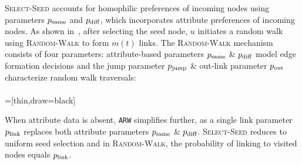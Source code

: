 \textsc{Select-Seed} accounts for homophilic preferences of incoming nodes using
parameters $p_{\scriptsize\mbox{same}}$ and $p_{\scriptsize\mbox{diff}}$, which incorporates attribute preferences of incoming nodes.
As shown in~, after selecting
the seed node, $u$ initiates a
random walk using \textsc{Random-Walk} to form $m(t)$ links.
The \textsc{Random-Walk} mechanism consists of four parameters: attribute-based parameters
$p_{\scriptsize\mbox{same}}$ \& $p_{\scriptsize\mbox{diff}}$ model edge formation decisions and the jump parameter $p_{\scriptsize\mbox{jump}}$ \&
out-link parameter $p_{\scriptsize\mbox{out}}$ characterize random walk traversals:
\\\\
=[thin,draw=black]

When attribute data is absent, \texttt{ARW} simplifies further, as
a single link parameter $p_{\scriptsize\mbox{link}}$ replaces both attribute parameters $p_{\scriptsize\mbox{same}}$ \& $p_{\scriptsize\mbox{diff}}$.
\textsc{Select-Seed} reduces to uniform seed selection and in
\textsc{Random-Walk}, the probability of linking to visited nodes equals $p_{\scriptsize\mbox{link}}$.


